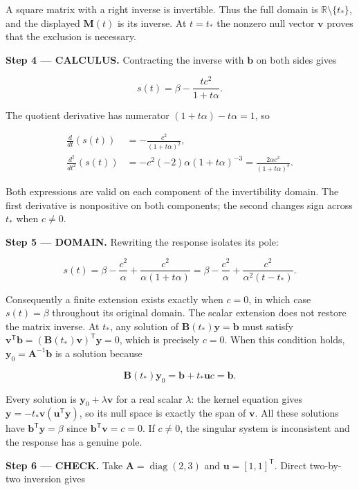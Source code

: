 \documentclass[11pt,oneside,openany]{book}
\begin{document}
A square matrix with a right inverse is invertible. Thus the full domain is \(\mathbb R\setminus\{t_*\}\), and the displayed \(\mathbf M(t)\) is its inverse. At \(t=t_*\) the nonzero null vector \(\mathbf v\) proves that the exclusion is necessary.

\endgroup
\textbf{Step 4 --- CALCULUS.} Contracting the inverse with \(\mathbf b\) on both sides gives

\[
s(t)=\beta-\frac{tc^2}{1+t\alpha}.
\]

The quotient derivative has numerator \((1+t\alpha)-t\alpha=1\), so

\[
\begin{aligned}
\frac{d}{dt}\left(s(t)\right)&=-\frac{c^2}{(1+t\alpha)^2},\\
\frac{d^2}{dt^2}\left(s(t)\right)
&=-c^2(-2)\alpha(1+t\alpha)^{-3}
=\frac{2\alpha c^2}{(1+t\alpha)^3}.
\end{aligned}
\]

Both expressions are valid on each component of the invertibility domain. The first derivative is nonpositive on both components; the second changes sign across \(t_*\) when \(c\ne0\).

\begin{DomainStep}
\textbf{Step 5 --- DOMAIN.} Rewriting the response isolates its pole:

\[
s(t)=\beta-\frac{c^2}{\alpha}
+\frac{c^2}{\alpha(1+t\alpha)}
=\beta-\frac{c^2}{\alpha}+\frac{c^2}{\alpha^2(t-t_*)}.
\]

Consequently a finite extension exists exactly when \(c=0\), in which case \(s(t)=\beta\) throughout its original domain. The scalar extension does not restore the matrix inverse. At \(t_*\), any solution of \(\mathbf B(t_*)\mathbf y=\mathbf b\) must satisfy
\(\mathbf v^{\mathsf T}\mathbf b=(\mathbf B(t_*)\mathbf v)^{\mathsf T}\mathbf y=0\), which is precisely \(c=0\). When this condition holds, \(\mathbf y_0=\mathbf A^{-1}\mathbf b\) is a solution because

\[
\mathbf B(t_*)\mathbf y_0=\mathbf b+t_*\mathbf u c=\mathbf b.
\]

Every solution is \(\mathbf y_0+\lambda\mathbf v\) for a real scalar \(\lambda\): the kernel equation gives \(\mathbf y=-t_*\mathbf v(\mathbf u^{\mathsf T}\mathbf y)\), so its null space is exactly the span of \(\mathbf v\). All these solutions have \(\mathbf b^{\mathsf T}\mathbf y=\beta\) since \(\mathbf b^{\mathsf T}\mathbf v=c=0\). If \(c\ne0\), the singular system is inconsistent and the response has a genuine pole.

\end{DomainStep}
\textbf{Step 6 --- CHECK.} Take \(\mathbf A=\operatorname{diag}(2,3)\) and \(\mathbf u=[1,1]^{\mathsf T}\). Direct two-by-two inversion gives
\end{document}
